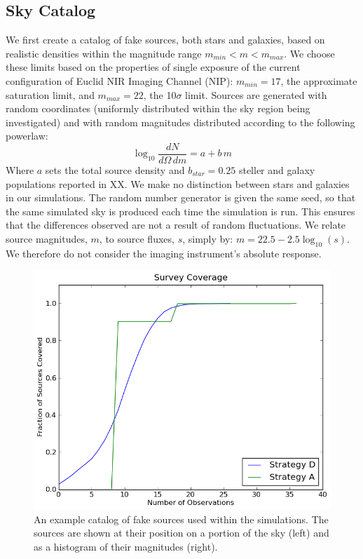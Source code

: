\documentclass[manuscript]{aastex}
\begin{document}
\subsection{Sky Catalog}
We first create a catalog of fake sources, both stars and galaxies, based on realistic densities within the magnitude range $m_{min} < m < m_{max}$. We choose these limits based on the properties of single exposure of the current configuration of Euclid NIR Imaging Channel (NIP): $m_{min} = 17$, the approximate saturation limit, and $m_{max} = 22$, the 10$\sigma$ limit. Sources are generated with random coordinates (uniformly distributed within the sky region being investigated) and with random magnitudes distributed according to the following powerlaw:
\begin{displaymath}
\log_{10} \frac{dN}{d\Omega\,dm} = a + b\,m
\end{displaymath}
Where $a$ sets the total source density and $b_{star} = 0.25$ steller and galaxy populations reported in XX. We make no distinction between stars and galaxies in our simulations. The random number generator is given the same seed, so that the same simulated sky is produced each time the simulation is run. This ensures that the differences observed are not a result of random fluctuations. We relate source magnitudes, $m$, to source fluxes, $s$, simply by: $m = 22.5 - 2.5\log_{10}(s)$. We therefore do not consider the imaging instrument's absolute response.

\begin{figure}[ht]
\begin{center}
\includegraphics[width=\textwidth]{coverage.png}
\end{center}
\caption{An example catalog of fake sources used within the simulations. The sources are shown at their position on a portion of the sky (left) and as a histogram of their magnitudes (right).
\label{fig:sky}}
\end{figure}
\end{document}
